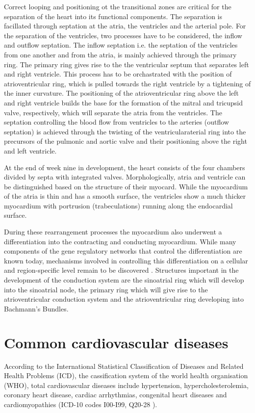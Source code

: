 Correct looping and positioning ot the transitional zones are critical for the separation of the heart into its functional components. The separation is facillated through septation at the atria, the ventricles and the arterial pole. For the separation of the ventricles, two processes have to be considered, the inflow and outflow septation. The inflow septation i.e. the septation of the ventricles from one another and from the atria, is mainly achieved through the primary ring. The primary ring gives rise to the the ventricular septum that separates left and right ventricle. This process has to be orchastrated with the position of atrioventricular ring, which is pulled towards the right ventricle by a tightening of the inner curvature. The positioning of the atrioventricular ring above the left and right ventricle builds the base for the formation of the mitral and tricupsid valve, respectively, which will separate the atria from the ventricles.  The septation controlling the blood flow from ventricles to the arteries (outflow septation) is achieved through the twisting of the ventricularaterial ring into the precursors of the pulmonic and aortic valve and their positioning above the right and left ventricle.  

At the end of week nine in development, the heart consists of the four chambers divided by septa with integrated valves. Morphologically, atria and ventricle can be distinguished based on the structure of their myocard. While the myocardium of the atria is thin and has a smooth surface, the ventricles show a much thicker myocardium with portrusion (trabeculations) running along the endocardial surface. 

During these rearrangement processes the myocardium also underwent a differentiation into the contracting and conducting myocardium. While many components of the gene regulatory networks that control the differentiation are known today,  mechanisms involved in controlling this differentiation on a cellular and region-specific level remain to be discovered \citep{Christoffels2009,Paige2015,Park2017}. Structures important in the development of the conduction system are the sinoatrial ring which will develop into the sinoatrial node, the primary ring which will give rise to the atrioventricular conduction system and the atrioventricular ring developing into Bachmann's Bundles. 

\section{Common cardiovascular diseases}
\label{subsection:CVD}
According to the International Statistical Classification of Diseases and Related Health Problems (ICD), the cassification system of the world health organisation (WHO), total cardiovascular diseases include hypertension, hypercholesterolemia, coronary heart disease, cardiac arrhythmias, congenital heart diseases and cardiomyopathies (ICD-10 codes I00-I99, Q20-28 \citep{WHO2016}). 

